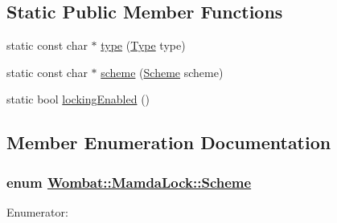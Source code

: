 \subsection*{Static Public Member Functions}
\begin{CompactItemize}
\item 
static const char $\ast$ \hyperlink{classWombat_1_1MamdaLock_bb8af28636c6a343cd9118e568f19068}{type} (\hyperlink{classWombat_1_1MamdaLock_93b6f826e707ab70c51dac7b99bce85b}{Type} type)
\item 
static const char $\ast$ \hyperlink{classWombat_1_1MamdaLock_c622986074209cfe944e3d163a5538e7}{scheme} (\hyperlink{classWombat_1_1MamdaLock_87d4e5bd1d3db6a91d9f769315bfd32e}{Scheme} scheme)
\item 
static bool \hyperlink{classWombat_1_1MamdaLock_9e49f016c806144085a104b8bc490894}{locking\-Enabled} ()
\end{CompactItemize}


\subsection{Member Enumeration Documentation}
\hypertarget{classWombat_1_1MamdaLock_87d4e5bd1d3db6a91d9f769315bfd32e}{
\subsubsection[Scheme]{\setlength{\rightskip}{0pt plus 5cm}enum \hyperlink{classWombat_1_1MamdaLock_87d4e5bd1d3db6a91d9f769315bfd32e}{Wombat::Mamda\-Lock::Scheme}}}
\label{classWombat_1_1MamdaLock_87d4e5bd1d3db6a91d9f769315bfd32e}


\begin{Desc}
\item[Enumerator: ]\par
\begin{description}
\item[{\em 
\hypertarget{classWombat_1_1MamdaLock_87d4e5bd1d3db6a91d9f769315bfd32e1aec4e883d9cb850c1369479aef9e1db}{
SHARED}
\label{classWombat_1_1MamdaLock_87d4e5bd1d3db6a91d9f769315bfd32e1aec4e883d9cb850c1369479aef9e1db}
}]\item[{\em 
\hypertarget{classWombat_1_1MamdaLock_87d4e5bd1d3db6a91d9f769315bfd32eebbe078a8c76bade4e757bc04016e07a}{
EXCLUSIVE}
\label{classWombat_1_1MamdaLock_87d4e5bd1d3db6a91d9f769315bfd32eebbe078a8c76bade4e757bc04016e07a}
}]\end{description}
\end{Desc}


